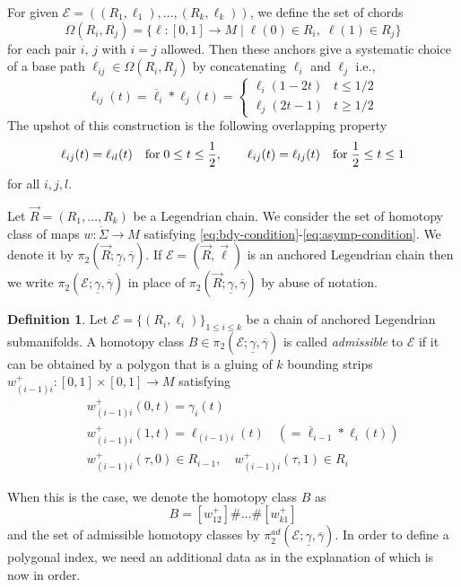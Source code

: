 \documentclass[reqno]{amsart}
\newcommand{\be}{\begin{equation}}
\newcommand{\ee}{\end{equation}}
\newcommand{\bea}{\begin{eqnarray}}
\newcommand{\eea}{\end{eqnarray}}
\theoremstyle{theorem}
\theoremstyle{definition}
\newtheorem{defn}[thm]{Definition}
\numberwithin{equation}{section}
\begin{document}
For given $\mathcal{E} = ((R_1,\ell_1),\ldots,(R_k,\ell_k))$, we define the set of chords
$$
\Omega(R_i,R_j) = \{\ell:[0,1] \rightarrow M \mid \ell(0)\in R_i,\;\ell(1)\in R_j\}
$$
for each pair $i, \, j$ with $i = j$ allowed.
Then these anchors give a systematic choice of a base path $\ell_{ij}\in\Omega(R_i,R_j)$ by concatenating $\ell_i$ and $\ell_j$ i.e.,
\be\label{eq:base-path}
\ell_{ij}(t) = \overline{\ell}_i\ast\ell_j(t) =
\left\{
\begin{array}{ll}
\ell_i(1-2t) & t\leq 1/2 \\
\ell_j(2t-1) & t\geq 1/2
\end{array} \right.
\ee
The upshot of this construction is the following overlapping property
\be\label{eq:overlapping}
\ell_{ij}(t)=\ell_{il}(t) \quad {\rm for} \; 0\leq t\leq \frac{1}{2},
\qquad \ell_{ij}(t) = \ell_{lj}(t) \quad {\rm for} \; \frac{1}{2} \leq t \leq 1
\ee
for all $i,j,l$.

Let $\vec{R} = (R_1,\ldots,R_k)$ be a Legendrian chain. We consider the set of homotopy class of maps $w:\dot \Sigma \rightarrow M$ satisfying \eqref{eq:bdy-condition}-\eqref{eq:asymp-condition}. We denote it by $\pi_2(\vec{R};\underline \gamma,\overline \gamma)$. If $\mathcal{E} = (\vec{R},\vec{\ell})$ is an anchored Legendrian chain then we write $\pi_2(\mathcal{E};\underline \gamma,\overline \gamma)$
in place of $\pi_2(\vec{R};\underline \gamma,\overline \gamma)$ by abuse of notation.

\begin{defn}\label{defn:admissible}
Let $\mathcal{E} = \{(R_i,\ell_i)\}_{1\leq i\leq k}$ be a chain of anchored Legendrian submanifolds. A homotopy class $B \in \pi_2(\mathcal{E};\underline \gamma,\overline \gamma)$ is called
\emph{admissible} to $\mathcal{E}$ if it can be obtained by a polygon that is a gluing of $k$ bounding strips $w_{(i-1)i}^+:[0,1]\times[0,1] \rightarrow M$ satisfying
\bea\label{eq:pos-admissible-piece}
& &w_{(i-1)i}^+(0,t)  = \gamma_i(t) \nonumber\\
& &w_{(i-1)i}^+(1,t) =  \ell_{(i-1)i}(t) \quad (= \overline{\ell}_{i-1}\ast\ell_i(t) )\\
& &w_{(i-1)i}^+(\tau,0)  \in  R_{i-1}, \quad w_{(i-1)i}^+(\tau,1)\in R_i\nonumber
\eea
\end{defn}

When this is the case, we denote the homotopy class $B$ as
$$
B = [w_{12}^+]\#\ldots\#[w_{k1}^+]
$$
and the set of admissible homotopy classes by $\pi^{ad}_2(\mathcal{E};\underline \gamma,\overline \gamma)$.
In order to define a polygonal index, we need an additional data as in \cite{fooo:anchored}
the explanation of which is now in order.
\end{document}
